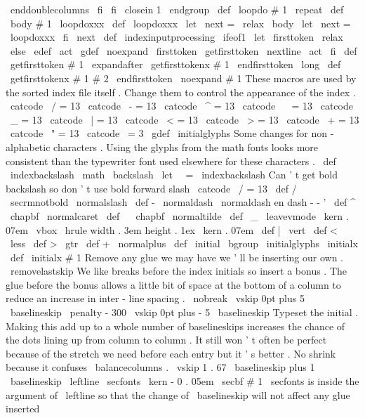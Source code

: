 {{{{%
\
enddoublecolumns
\
fi
\
fi
\
closein
1
\
endgroup
}
\
def
\
loopdo
#
1
\
repeat
{
\
def
\
body
{
#
1
}
\
loopdoxxx
}
\
def
\
loopdoxxx
{
\
let
\
next
=
\
relax
\
body
\
let
\
next
=
\
loopdoxxx
\
fi
\
next
}
\
def
\
indexinputprocessing
{
%
\
ifeof1
\
let
\
firsttoken
\
relax
\
else
\
edef
\
act
{
\
gdef
\
noexpand
\
firsttoken
{
\
getfirsttoken
\
nextline
}
}
%
\
act
\
fi
}
\
def
\
getfirsttoken
#
1
{
\
expandafter
\
getfirsttokenx
#
1
\
endfirsttoken
}
\
long
\
def
\
getfirsttokenx
#
1
#
2
\
endfirsttoken
{
\
noexpand
#
1
}
%
These
macros
are
used
by
the
sorted
index
file
itself
.
%
Change
them
to
control
the
appearance
of
the
index
.
{
\
catcode
\
/
=
13
\
catcode
\
-
=
13
\
catcode
\
^
=
13
\
catcode
\
~
=
13
\
catcode
\
_
=
13
\
catcode
\
|
=
13
\
catcode
\
<
=
13
\
catcode
\
>
=
13
\
catcode
\
+
=
13
\
catcode
\
"
=
13
\
catcode
\
=
3
\
gdef
\
initialglyphs
{
%
%
Some
changes
for
non
-
alphabetic
characters
.
Using
the
glyphs
from
the
%
math
fonts
looks
more
consistent
than
the
typewriter
font
used
elsewhere
%
for
these
characters
.
\
def
\
indexbackslash
{
\
math
{
\
backslash
}
}
%
\
let
\
\
=
\
indexbackslash
%
%
Can
'
t
get
bold
backslash
so
don
'
t
use
bold
forward
slash
\
catcode
\
/
=
13
\
def
/
{
{
\
secrmnotbold
\
normalslash
}
}
%
\
def
-
{
{
\
normaldash
\
normaldash
}
}
%
en
dash
-
-
'
\
def
^
{
{
\
chapbf
\
normalcaret
}
}
%
\
def
~
{
{
\
chapbf
\
normaltilde
}
}
%
\
def
\
_
{
%
\
leavevmode
\
kern
.
07em
\
vbox
{
\
hrule
width
.
3em
height
.
1ex
}
\
kern
.
07em
}
%
\
def
|
{
\
vert
}
%
\
def
<
{
\
less
}
%
\
def
>
{
\
gtr
}
%
\
def
+
{
\
normalplus
}
%
}
}
\
def
\
initial
{
%
\
bgroup
\
initialglyphs
\
initialx
}
\
def
\
initialx
#
1
{
%
%
Remove
any
glue
we
may
have
we
'
ll
be
inserting
our
own
.
\
removelastskip
%
%
We
like
breaks
before
the
index
initials
so
insert
a
bonus
.
%
The
glue
before
the
bonus
allows
a
little
bit
of
space
at
the
%
bottom
of
a
column
to
reduce
an
increase
in
inter
-
line
spacing
.
\
nobreak
\
vskip
0pt
plus
5
\
baselineskip
\
penalty
-
300
\
vskip
0pt
plus
-
5
\
baselineskip
%
%
Typeset
the
initial
.
Making
this
add
up
to
a
whole
number
of
%
baselineskips
increases
the
chance
of
the
dots
lining
up
from
column
%
to
column
.
It
still
won
'
t
often
be
perfect
because
of
the
stretch
%
we
need
before
each
entry
but
it
'
s
better
.
%
%
No
shrink
because
it
confuses
\
balancecolumns
.
\
vskip
1
.
67
\
baselineskip
plus
1
\
baselineskip
\
leftline
{
\
secfonts
\
kern
-
0
.
05em
\
secbf
#
1
}
%
%
\
secfonts
is
inside
the
argument
of
\
leftline
so
that
the
change
of
%
\
baselineskip
will
not
affect
any
glue
inserted
}}}}
